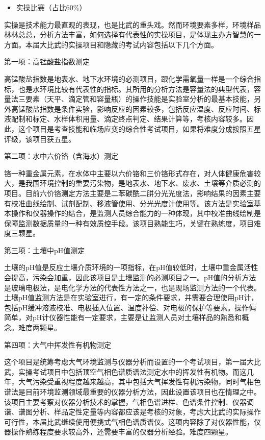 \documentclass[
]{book}
\providecommand{\tightlist}{%
  \setlength{\itemsep}{0pt}\setlength{\parskip}{0pt}}
\begin{document}
\begin{itemize}
\tightlist
\item
  实操比赛（占比60\%）
\end{itemize}

实操是技术能力最直观的表现，也是比武的重头戏。然而环境要素多样，环境样品林林总总，分析方法丰富，如何选择有代表性的实操项目，是体现主办方智慧的一方面。本届大比武的实操项目和隐藏的考试内容包括以下几个方面。

第一项：高锰酸盐指数测定

高锰酸盐指数是地表水、地下水环境的必测项目，跟化学需氧量一样是一个综合指标，也是水环境比较有代表性的指标。其所用的分析方法是容量法的典型代表，容量法三要素（天平、滴定管和容量瓶）的操作技能是实验室分析的最基本技能，另外高锰酸盐指数是条件实验，影响反应的因素较多，包括反应温度、反应时间、标液配制和标定、水样体积用量、滴定终点判定、结果计算等，考核内容较多。因此，这个项目是考查技能和临场应变的综合性考试项目，如果将难度分成按照五星评级，该项目获五星。

第二项：水中六价铬（含海水）测定

铬一种重金属元素，在水体中主要以六价铬和三价铬形式存在，对人体健康危害较大，是我国环境控制的重要污染物，是地表水、地下水、废水、土壤等介质必测的项目。目前六价铬测定方法主要是二苯碳酰二肼分光光度法，影响结果的因素主要有校准曲线绘制、试剂配制、移液管使用、分光光度计使用等。该方法是实验室基本操作和仪器操作的结合，是监测人员综合能力的一种体现，其中校准曲线绘制是保障监测数据质量的一种有效质控手段。该项目熟能生巧，关键在熟练度，项目难度三颗星。

第三项：土壤中pH值测定

土壤的pH值是反应土壤介质环境的一项指标，在pH值较低时，土壤中重金属活性会提高，污染会加重，因此该项目是土壤监测的必测项目之一。pH值的分析方法是玻璃电极法，是电化学方法的代表性方法之一，也是现场监测方法的一个代表。土壤pH值监测方法是在实验室进行，有一定的条件要求，并需要合理使用pH计，包括pH缓冲溶液校准、电极插入位置、温度补偿、对电极的保护等要素。操作偏简单，对pH计仪器性能有一定要求，主要是让监测人员对土壤样品的熟悉和概念。难度两颗星。

第四项：大气中挥发性有机物测定

这个项目是统筹考虑大气环境监测与仪器分析而设置的一个考试项目，第一届大比武，实操考试项目中包括顶空气相色谱质谱法测定水中的挥发性有机物。而这几年，大气污染受重视程度越来越高，其中包括大气挥发性有机污染物，同时气相色谱法是目前环境监测领域最重要的仪器分析方法，因此设置该项目也在情理之中。该项目主要考察对仪器分析技术的掌握，气相色谱进样、色谱条件控制、仪器调谐、谱图分析、样品定性定量等内容都应该是考核的对象，考虑大比武的实际操作可行性，本届比武继续使用便携式气相色谱质谱仪。这项内容除了对仪器性能，仪器操作熟练程度要求较高外，还需要丰富的仪器分析经验。难度四颗星。
\end{document}
